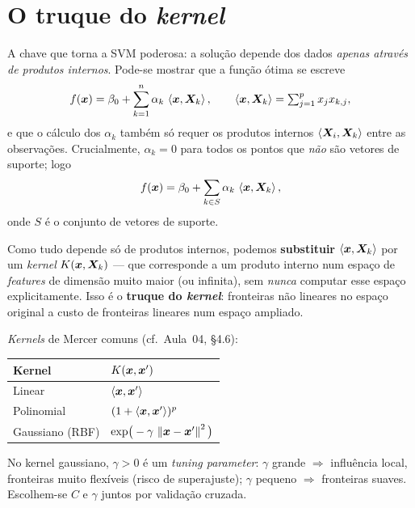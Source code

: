 \documentclass[11pt,a4paper]{article}
\begin{document}
\section{O truque do \emph{kernel}}
A chave que torna a SVM poderosa: a solução depende dos dados \emph{apenas através
de produtos internos}. Pode-se mostrar que a função ótima se escreve
\begin{equation}\label{eq:dual}
  f(\bm{x}) = \beta_0 + \sum_{k=1}^n \alpha_k\,\left\langle \bm{x}, \bm{X}_k \right\rangle,
  \qquad \left\langle \bm{x}, \bm{X}_k \right\rangle=\textstyle\sum_{j=1}^p x_j x_{k,j},
\end{equation}
e que o cálculo dos $\alpha_k$ também só requer os produtos internos
$\left\langle \bm{X}_i, \bm{X}_k \right\rangle$ entre as observações. Crucialmente, $\alpha_k=0$ para todos os
pontos que \emph{não} são vetores de suporte; logo
\[
  f(\bm{x}) = \beta_0 + \sum_{k\in S}\alpha_k\,\left\langle \bm{x}, \bm{X}_k \right\rangle,
\]
onde $S$ é o conjunto de vetores de suporte.

\begin{ideia}
Como tudo depende só de produtos internos, podemos \textbf{substituir}
$\left\langle \bm{x}, \bm{X}_k \right\rangle$ por um \emph{kernel} $K(\bm{x},\bm{X}_k)$ --- que corresponde a um produto
interno num espaço de \emph{features} de dimensão muito maior (ou infinita), sem
\emph{nunca} computar esse espaço explicitamente. Isso é o \textbf{truque do
\emph{kernel}}: fronteiras não lineares no espaço original a custo de fronteiras
lineares num espaço ampliado.
\end{ideia}

\noindent \emph{Kernels} de Mercer comuns (cf.\ Aula~04, §4.6):
\begin{center}\small
\renewcommand{\arraystretch}{1.4}
\begin{tabular}{@{}ll@{}}
\toprule
\textbf{Kernel} & \textbf{$K(\bm{x},\bm{x}')$} \\
\midrule
Linear      & $\left\langle \bm{x}, \bm{x}' \right\rangle$ \\
Polinomial  & $(1+\left\langle \bm{x}, \bm{x}' \right\rangle)^{p}$ \\
Gaussiano (RBF) & $\exp\!\big(-\gamma\,\left\lVert \bm{x}-\bm{x}' \right\rVert^2\big)$ \\
\bottomrule
\end{tabular}
\end{center}
No kernel gaussiano, $\gamma>0$ é um \emph{tuning parameter}: $\gamma$ grande
$\Rightarrow$ influência local, fronteiras muito flexíveis (risco de superajuste);
$\gamma$ pequeno $\Rightarrow$ fronteiras suaves. Escolhem-se $C$ e $\gamma$ juntos
por validação cruzada.
\end{document}
